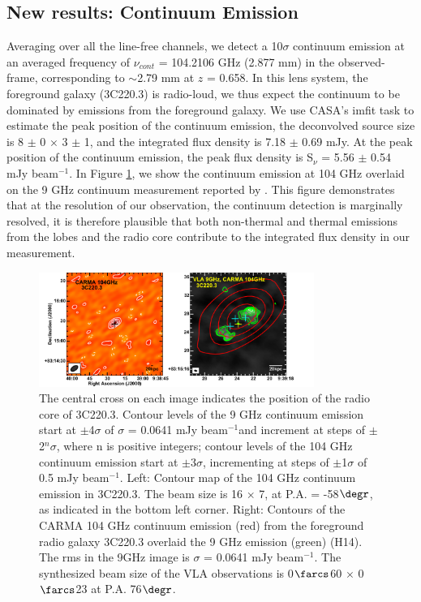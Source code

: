 \documentclass[twocolumn,apj,numberedappendix]{emulateapj}
\newcommand{\pmOne}{$^{-1}$}
\begin{document}
\subsection{New results: Continuum Emission} 
Averaging over all the line-free channels, we detect a 10$\sigma$ continuum emission at an averaged frequency of $\nu_{cont}$ = 104.2106 GHz (2.877 mm) in the observed-frame, corresponding to $\sim$2.79 mm at $z$ = 0.658. In this lens system, the 
foreground galaxy (3C220.3) is radio-loud, we thus expect the continuum to be dominated by emissions from the foreground galaxy. We use CASA's {\sc imfit} task to estimate the peak position of the continuum emission, the deconvolved source size is 8 $\pm$ 0 $\times$ 3 $\pm$ 1, and the integrated flux density is 7.18 $\pm$ 0.69 mJy. At the peak position of the continuum emission, the peak flux density is S$_\nu$ = 5.56 $\pm$ 0.54 
mJy beam\pmOne.
In Figure \ref{fig:cont}, we show the continuum emission at 104 GHz overlaid on the 9 GHz continuum measurement reported by \citet{Haas14}. This figure demonstrates that at the resolution of our observation, the continuum detection is marginally resolved, it is therefore plausible that both non-thermal and thermal emissions from the lobes and the radio core contribute to the integrated flux density in our measurement.

\begin{figure}[tbph]
\centering
\includegraphics[width=0.80\textwidth]{Figure/ContPanel}
\caption{The central cross on each image indicates the position of the radio core of 3C220.3. Contour levels of the 9 GHz continuum 
emission start at $\pm$4$\sigma$ of $\sigma$ = 0.0641 mJy beam\pmOne and increment at steps of $\pm$2$^n\sigma$, 
where n is positive integers; contour levels of the 104 GHz continuum emission start at $\pm$3$\sigma$, incrementing at steps 
of $\pm$1$\sigma$ of 0.5 mJy beam\pmOne.
Left: Contour map of the 104 GHz continuum emission in 3C220.3. The beam size is 16 $\times$ 7, at P.A. = 
-58$\degr$, as indicated in the bottom left corner. Right: Contours of the CARMA 104 GHz continuum emission (red) from the 
foreground radio galaxy 3C220.3 overlaid the 9 GHz emission (green) (H14). The rms in the 9GHz image is $\sigma$ 
= 0.0641 mJy beam\pmOne. The synthesized beam size of the VLA observations is 0$\farcs$60 $\times$ 0$\farcs$23 at P.A. 
76$\degr$. 
\label{fig:cont}}
\end{figure}
\end{document}

